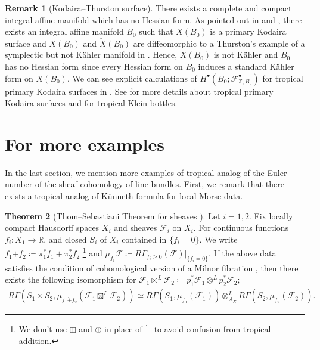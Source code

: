 \documentclass[a4paper,dvipdfmx,reqno,12pt]{amsart}
\theoremstyle{definition}
\newtheorem{theorem}{Theorem}[section]
\newtheorem{remark}[theorem]{Remark}
\newcommand{\deq}{\coloneqq}
\newcommand{\mcal}[1]{\mathcal{#1}}%
\newcommand{\myfootnote}[1]{\hspace{-5pt}\footnote{#1}}
\numberwithin{equation}{section}
\begin{document}
\begin{remark}[{Kodaira--Thurston surface}]
There exists a complete and compact integral affine manifold
  which has no Hessian form.
As pointed out in \cite[Example 1.14]{grossMirrorSymmetryLogarithmic2006a}
and \cite[p.403]{MR1461965}, there exists an integral affine manifold
$B_0$ such that
$X(B_0)$ is a primary Kodaira surface and $X(B_0)$
and $\check{X}(B_0)$
are diffeomorphic to a Thurston's example of a symplectic but
not K\"ahler manifold in \cite{MR402764}.
Hence, $X(B_0)$ is not K\"ahler and $B_0$ has no
Hessian form since every Hessian form on $B_0$ induces a 
standard K\"ahler form
on $X(B_0)$.
We can see explicit calculations of 
$H^{\bullet}(B_0;\mathcal{F}_{\mathbb{Z},B_0}^{\bullet})$
for tropical primary Kodaira surfaces in \cite{maehara2023}.
See \cite{MR1422337} for more details about tropical 
primary Kodaira surfaces and 
\cite{MR3079343,MR3894860} for tropical Klein bottles.

\end{remark}

\section{For more examples}
In the last section, we mention more examples of 
tropical analog of the Euler number of 
the sheaf cohomology of line bundles.
First, we remark that there exists
a tropical analog of K\"unneth formula for 
local Morse data.

\begin{theorem}[{Thom--Sebastiani Theorem for sheaves \cite[Theorem 1.2.2]{MR2031639}}]
Let $i=1,2$.
Fix locally compact Hausdorff spaces $X_i$ and 
sheaves $\mathcal{F}_i$ on $X_i$.
For continuous functions $f_i\colon X_1 \to\mathbb{R}$,
and closed $S_i$ of $X_i$ contained in $\{f_i=0\}$.
We write $f_1\dot{+} f_2\deq \pi_1^{*}f_1+\pi_2^{*}f_2$
\myfootnote{
We don't use $\boxplus$ and $\oplus$ in place of
$\dot{+}$
to avoid confusion from tropical addition.}
and 
$\mu_{f_i}\mathcal{F}\deq R\Gamma_{f_i\geq 0}
(\mathcal{F})|_{\{f_i=0\}}$.
If the above data satisfies
the condition of cohomological version of a Milnor 
fibration \cite[Assumption 1.1.1]{MR2031639},
then there exists the following isomorphism 
for $\mcal{F}_1\boxtimes^{L} \mcal{F}_2\deq 
p_1^{*}\mcal{F}_1\otimes^{L}p^{*}_2\mcal{F}_2$;
\begin{align}
    R\Gamma(S_1\times S_2,\mu_{f_1\dot{+}f_2}(\mcal{F}_1\boxtimes^{L} \mcal{F}_2))
    \simeq R\Gamma(S_1,\mu_{f_1}(\mcal{F}_1))
    \otimes^{L}_{A_X}R\Gamma(S_2,\mu_{f_2}(\mcal{F}_2)).
\end{align}

\end{theorem}
\end{document}
